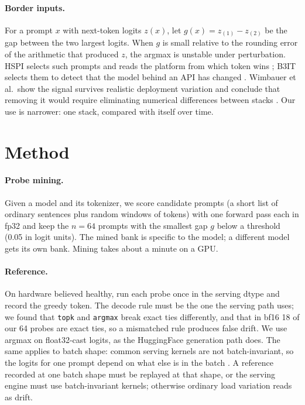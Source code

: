 \documentclass[11pt]{article}
\begin{document}
\paragraph{Border inputs.}
For a prompt $x$ with next-token logits $z(x)$, let $g(x) = z_{(1)} - z_{(2)}$ be the gap between the two largest logits. When $g$ is small relative to the rounding error of the arithmetic that produced $z$, the argmax is unstable under perturbation. HSPI selects such prompts and reads the platform from which token wins \citep{zhang2024hspi}; B3IT selects them to detect that the model behind an API has changed \citep{chauvin2026b3it}. Wimbauer et al.\ show the signal survives realistic deployment variation and conclude that removing it would require eliminating numerical differences between stacks \citep{wimbauer2026fingerprinting}. Our use is narrower: one stack, compared with itself over time.

\section{Method}

\paragraph{Probe mining.}
Given a model and its tokenizer, we score candidate prompts (a short list of ordinary sentences plus random windows of tokens) with one forward pass each in fp32 and keep the $n=64$ prompts with the smallest gap $g$ below a threshold (0.05 in logit units). The mined bank is specific to the model; a different model gets its own bank. Mining takes about a minute on a GPU.

\paragraph{Reference.}
On hardware believed healthy, run each probe once in the serving dtype and record the greedy token. The decode rule must be the one the serving path uses; we found that \texttt{topk} and \texttt{argmax} break exact ties differently, and that in bf16 18 of our 64 probes are exact ties, so a mismatched rule produces false drift. We use argmax on float32-cast logits, as the HuggingFace generation path does. The same applies to batch shape: common serving kernels are not batch-invariant, so the logits for one prompt depend on what else is in the batch \citep{he2025nondeterminism}. A reference recorded at one batch shape must be replayed at that shape, or the serving engine must use batch-invariant kernels; otherwise ordinary load variation reads as drift.
\end{document}

